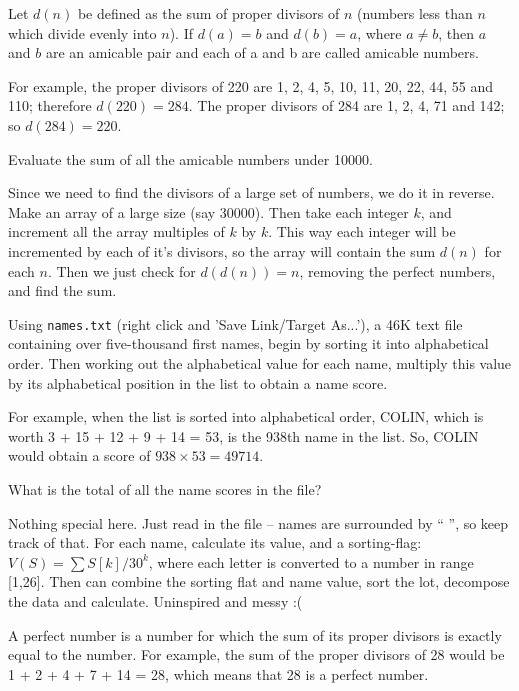 Let $d(n)$ be defined as the sum of proper divisors of $n$ (numbers less than $n$ which divide evenly into $n$).
If $d(a) = b$ and $d(b) = a$, where $a \neq b$, then $a$ and $b$ are an amicable pair and each of a and b are called amicable numbers.

For example, the proper divisors of 220 are 1, 2, 4, 5, 10, 11, 20, 22, 44, 55 and 110; therefore $d(220) = 284$. The proper divisors of 284 are 1, 2, 4, 71 and 142; so $d(284) = 220$.

Evaluate the sum of all the amicable numbers under 10000.

Since we need to find the divisors of a large set of numbers, we do it in reverse.  Make an array
of a large size (say 30000).  Then take each integer $k$, and increment all the array multiples of $k$
by $k$.  This way each integer will be incremented by each of it's divisors, so the array will contain
the sum $d(n)$ for each $n$.  Then we just check for $d(d(n)) = n$, removing the perfect numbers, and find
the sum.




Using \verb"names.txt" (right click and 'Save Link/Target As...'), a 46K text file containing over five-thousand first names, begin by sorting it into alphabetical order. Then working out the alphabetical value for each name, multiply this value by its alphabetical position in the list to obtain a name score.

For example, when the list is sorted into alphabetical order, COLIN, which is worth 3 + 15 + 12 + 9 + 14 = 53, is the 938th name in the list. So, COLIN would obtain a score of $938 \times 53 = 49714$.

What is the total of all the name scores in the file?

Nothing special here.  Just read in the file -- names are surrounded by `` '', so keep track of that.  For each name, calculate its value, and a sorting-flag: $V(S) = \sum S[k]/30^k$, where each letter is converted to a number in range [1,26].  Then can 
combine the sorting flat and name value, sort the lot, decompose the data and calculate.  Uninspired and messy :(




A perfect number is a number for which the sum of its proper divisors is exactly equal to the number. For example, the sum of the proper divisors of 28 would be 1 + 2 + 4 + 7 + 14 = 28, which means that 28 is a perfect number.

